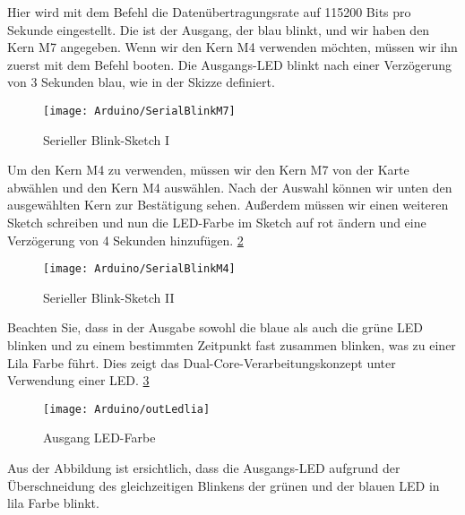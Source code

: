 Hier wird mit dem Befehl  die Datenübertragungsrate auf 115200 Bits pro Sekunde eingestellt. Die  ist der Ausgang, der blau blinkt, und wir haben den Kern M7 angegeben. Wenn wir den Kern M4 verwenden möchten, müssen wir ihn zuerst mit dem Befehl  booten. Die Ausgangs-LED blinkt nach einer Verzögerung von 3 Sekunden blau, wie in der Skizze definiert.

\begin{figure}[H]
    \centering
    \texttt{[image: Arduino/SerialBlinkM7]}
    \caption{Serieller Blink-Sketch I}
    \label{NiclaVDual}
\end{figure}

Um den Kern M4 zu verwenden, müssen wir den Kern M7 von der Karte abwählen und den Kern M4 auswählen. Nach der Auswahl können wir unten den ausgewählten Kern zur Bestätigung sehen. Außerdem müssen wir einen weiteren Sketch schreiben und nun die LED-Farbe im Sketch auf rot ändern und eine Verzögerung von 4 Sekunden hinzufügen. \ref{NiclaVDual2}

\begin{figure}[H]
    \centering
    \texttt{[image: Arduino/SerialBlinkM4]}
    \caption{Serieller Blink-Sketch II}
    \label{NiclaVDual2}
\end{figure}

Beachten Sie, dass in der Ausgabe sowohl die blaue als auch die grüne LED blinken und zu einem bestimmten Zeitpunkt fast zusammen blinken, was zu einer Lila Farbe führt. Dies zeigt das Dual-Core-Verarbeitungskonzept unter Verwendung einer LED. \ref{NiclaVDual3}

\begin{figure}[H]
    \centering
    \texttt{[image: Arduino/outLedlia]}
    \caption{Ausgang LED-Farbe}
    \label{NiclaVDual3}
\end{figure}

Aus der Abbildung ist ersichtlich, dass die Ausgangs-LED aufgrund der Überschneidung des gleichzeitigen Blinkens der grünen und der blauen LED in lila Farbe blinkt.
